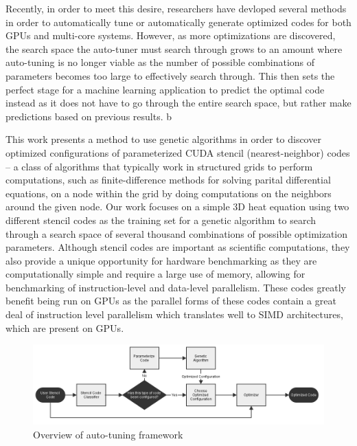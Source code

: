 \documentclass[conference]{IEEEtran}
\newcommand {\todo}[1] {\textcolor{red}{#1}}
\begin{document}
	Recently, in order to meet this desire, researchers have devloped several methods in order to automatically tune or automatically generate optimized codes for both GPUs and multi-core systems. However, as more optimizations are discovered, the search space the auto-tuner must search through grows to an amount where auto-tuning is no longer viable as the number of possible combinations of parameters becomes too large to effectively search through. This then sets the perfect stage for a machine learning application to predict the optimal code instead as it does not have to go through the entire search space, but rather make predictions based on previous results.
	b

	This work presents a method to use genetic algorithms in order to discover optimized configurations of parameterized CUDA stencil (nearest-neighbor) codes -- a class of algorithms that typically work in structured grids to perform computations, such as finite-difference methods for solving parital differential equations, on a node within the grid by doing computations on the neighbors around the given node. Our work focuses on a simple 3D heat equation using two different stencil codes as the training set for a genetic algorithm to search through a search space of several thousand combinations of possible optimization parameters. Although stencil codes are important as scientific computations, they also provide a unique opportunity for hardware benchmarking as they are computationally simple and require a large use of memory, allowing for benchmarking of instruction-level and data-level parallelism\cite{Datta}. These codes greatly benefit being run on GPUs as the parallel forms of these codes contain a great deal of instruction level parallelism which translates well to SIMD architectures, which are present on GPUs.

\begin{figure}[ht]
	\centering
	\includegraphics[width=18cm]{auto-tuning_framework.png}
	\caption{Overview of auto-tuning framework}
\end{figure}
\end{document}
